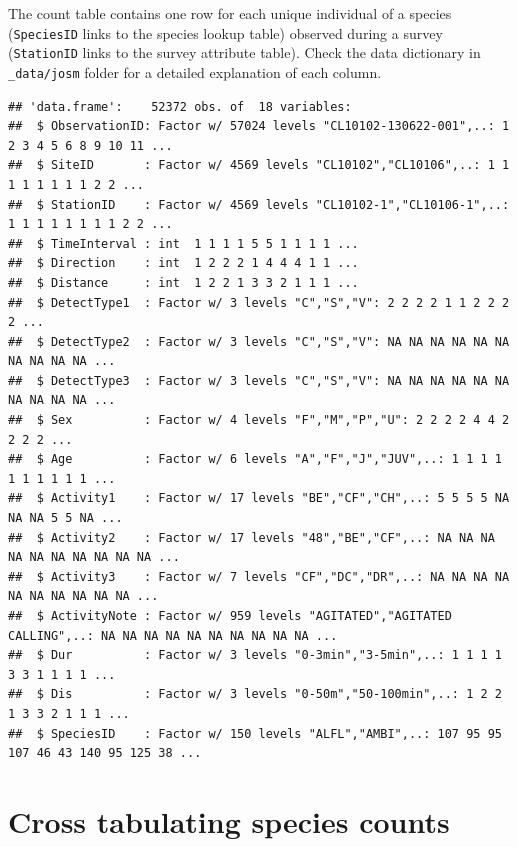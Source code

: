 \documentclass[12pt,]{book}
\newenvironment{Shaded}{\begin{snugshade}}{\end{snugshade}}
\newcommand{\KeywordTok}[1]{\textcolor[rgb]{0.13,0.29,0.53}{\textbf{#1}}}
\newcommand{\NormalTok}[1]{#1}
\newcommand{\OperatorTok}[1]{\textcolor[rgb]{0.81,0.36,0.00}{\textbf{#1}}}
\begin{document}
The count table contains one row for each unique individual
of a species (\texttt{SpeciesID} links to the species lookup table)
observed during a survey (\texttt{StationID} links to the survey attribute table).
Check the data dictionary in \texttt{\_data/josm} folder for a detailed explanation of each column.

\begin{Shaded}
\end{Shaded}

\begin{verbatim}
## 'data.frame':    52372 obs. of  18 variables:
##  $ ObservationID: Factor w/ 57024 levels "CL10102-130622-001",..: 1 2 3 4 5 6 8 9 10 11 ...
##  $ SiteID       : Factor w/ 4569 levels "CL10102","CL10106",..: 1 1 1 1 1 1 1 1 2 2 ...
##  $ StationID    : Factor w/ 4569 levels "CL10102-1","CL10106-1",..: 1 1 1 1 1 1 1 1 2 2 ...
##  $ TimeInterval : int  1 1 1 1 5 5 1 1 1 1 ...
##  $ Direction    : int  1 2 2 2 1 4 4 4 1 1 ...
##  $ Distance     : int  1 2 2 1 3 3 2 1 1 1 ...
##  $ DetectType1  : Factor w/ 3 levels "C","S","V": 2 2 2 2 1 1 2 2 2 2 ...
##  $ DetectType2  : Factor w/ 3 levels "C","S","V": NA NA NA NA NA NA NA NA NA NA ...
##  $ DetectType3  : Factor w/ 3 levels "C","S","V": NA NA NA NA NA NA NA NA NA NA ...
##  $ Sex          : Factor w/ 4 levels "F","M","P","U": 2 2 2 2 4 4 2 2 2 2 ...
##  $ Age          : Factor w/ 6 levels "A","F","J","JUV",..: 1 1 1 1 1 1 1 1 1 1 ...
##  $ Activity1    : Factor w/ 17 levels "BE","CF","CH",..: 5 5 5 5 NA NA NA 5 5 NA ...
##  $ Activity2    : Factor w/ 17 levels "48","BE","CF",..: NA NA NA NA NA NA NA NA NA NA ...
##  $ Activity3    : Factor w/ 7 levels "CF","DC","DR",..: NA NA NA NA NA NA NA NA NA NA ...
##  $ ActivityNote : Factor w/ 959 levels "AGITATED","AGITATED CALLING",..: NA NA NA NA NA NA NA NA NA NA ...
##  $ Dur          : Factor w/ 3 levels "0-3min","3-5min",..: 1 1 1 1 3 3 1 1 1 1 ...
##  $ Dis          : Factor w/ 3 levels "0-50m","50-100min",..: 1 2 2 1 3 3 2 1 1 1 ...
##  $ SpeciesID    : Factor w/ 150 levels "ALFL","AMBI",..: 107 95 95 107 46 43 140 95 125 38 ...
\end{verbatim}

\hypertarget{cross-tabulating-species-counts}{%
\section{Cross tabulating species counts}\label{cross-tabulating-species-counts}}
\end{document}
